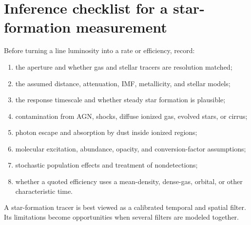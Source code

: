 \section{Inference checklist for a star-formation measurement}

Before turning a line luminosity into a rate or efficiency, record:
\begin{enumerate}
 \item the aperture and whether gas and stellar tracers are resolution matched;
 \item the assumed distance, attenuation, IMF, metallicity, and stellar models;
 \item the response timescale and whether steady star formation is plausible;
 \item contamination from AGN, shocks, diffuse ionized gas, evolved stars, or cirrus;
 \item photon escape and absorption by dust inside ionized regions;
 \item molecular excitation, abundance, opacity, and conversion-factor assumptions;
 \item stochastic population effects and treatment of nondetections;
 \item whether a quoted efficiency uses a mean-density, dense-gas, orbital, or other
 characteristic time.
\end{enumerate}
A star-formation tracer is best viewed as a calibrated temporal and spatial filter.
Its limitations become opportunities when several filters are modeled together.
